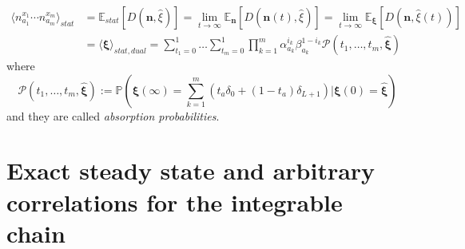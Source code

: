 \documentclass[10pt]{article}
\numberwithin{equation}{section}
\numberwithin{equation}{subsection}
\begin{document}
\begin{equation}\label{CorrelationByABS-prob}
	\begin{split}
	\langle n_{a_{1}}^{x_{1}}\cdots n_{a_{m}}^{x_{m}}\rangle_{stat}&=\mathbb{E}_{stat}\left[D(\bm{n},\hat{\xi})\right]=\lim_{t\to \infty}\mathbb{E}_{\bm{n}}\left[D(\bm{n}(t),\hat{\xi})\right]=\lim_{t\to \infty}\mathbb{E}_{\bm{\xi}}\left[D(\bm{n},\hat{\xi}(t))\right]
	\\&=\langle\hat{\bm{\xi}}\rangle_{stat,dual}=\sum_{t_{1}=0}^{1}\ldots \sum_{t_{m}=0}^{1}\prod_{k=1}^{m}\alpha_{a_{k}}^{i_{k}}\beta_{a_{k}}^{1-i_{k}}\mathcal{P}(t_{1},\ldots,t_{m},\hat{\bm{\xi}})
\end{split}
\end{equation}
where
\begin{equation}\label{absProbabilitiesIntegrable}
	\mathcal{P}(t_{1},\ldots,t_{m},\hat{\bm{\xi}}):=\mathbb{P}\left(\bm{\xi}(\infty)=\sum_{k=1}^{m}\left(t_{a}\delta_{0}+(1-t_{a})\delta_{L+1}\right)| \bm{\xi}(0)=\hat{\bm{\xi}}\right)
\end{equation}
and they are called \textit{absorption probabilities}. 






\section{Exact steady state and arbitrary correlations for the integrable chain}\label{sectionIntegrabiliy}
\end{document}
